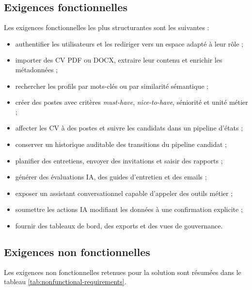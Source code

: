 \subsection{Exigences fonctionnelles}
Les exigences fonctionnelles les plus structurantes sont les suivantes :
\begin{itemize}
  \item authentifier les utilisateurs et les rediriger vers un espace adapté à leur rôle ;
  \item importer des CV PDF ou DOCX, extraire leur contenu et enrichir les métadonnées ;
  \item rechercher les profils par mots-clés ou par similarité sémantique ;
  \item créer des postes avec critères \textit{must-have}, \textit{nice-to-have}, séniorité et unité métier ;
  \item affecter les CV à des postes et suivre les candidats dans un pipeline d'états ;
  \item conserver un historique auditable des transitions du pipeline candidat ;
  \item planifier des entretiens, envoyer des invitations et saisir des rapports ;
  \item générer des évaluations IA, des guides d'entretien et des emails ;
  \item exposer un assistant conversationnel capable d'appeler des outils métier ;
  \item soumettre les actions IA modifiant les données à une confirmation explicite ;
  \item fournir des tableaux de bord, des exports et des vues de gouvernance.
\end{itemize}

\subsection{Exigences non fonctionnelles}
Les exigences non fonctionnelles retenues pour la solution sont résumées dans le tableau \ref{tab:nonfunctional-requirements}.

